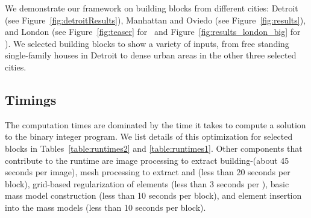 We demonstrate our framework on building blocks from different cities: Detroit (see Figure~\ref{fig:detroitResults}), Manhattan and Oviedo  (see Figure~\ref{fig:results}), and London (see Figure~\ref{fig:teaser} for \LondonRS\ and Figure~\ref{fig:results_london_big} for \LondonOC). We selected building blocks to show a variety of inputs, from free standing single-family houses in Detroit to dense urban areas in the other three selected cities.


\subsection{Timings}
The computation times are dominated by the time it takes to compute a solution to the binary integer program. We list details of this optimization for selected blocks in Tables~\ref{table:runtimes2} and \ref{table:runtimes1}.
Other components that contribute to the runtime are image processing to extract building-\facades (about 45 seconds per image), 
mesh processing to extract \sweepedges and \cleanprofiles (less than 20 seconds per block), grid-based regularization of \facade elements (less than 3 seconds per \facade), basic mass model construction (less than 10 seconds per block), and \facade element insertion into the mass models (less than 10 seconds per block).


